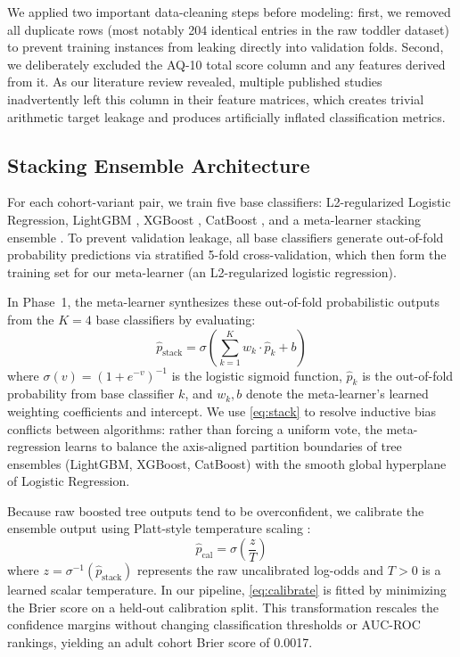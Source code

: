 \documentclass[conference]{IEEEtran}
\begin{document}
We applied two important data-cleaning steps before modeling: first, we removed all duplicate rows (most notably 204 identical entries in the raw toddler dataset) to prevent training instances from leaking directly into validation folds. Second, we deliberately excluded the AQ-10 total score column and any features derived from it. As our literature review revealed, multiple published studies inadvertently left this column in their feature matrices, which creates trivial arithmetic target leakage and produces artificially inflated classification metrics.

\subsection{Stacking Ensemble Architecture}

For each cohort-variant pair, we train five base classifiers: L2-regularized Logistic Regression, LightGBM \cite{ke2017lightgbm}, XGBoost \cite{chen2016xgboost}, CatBoost \cite{prokhorenkova2018catboost}, and a meta-learner stacking ensemble \cite{wolpert1992}. To prevent validation leakage, all base classifiers generate out-of-fold probability predictions via stratified 5-fold cross-validation, which then form the training set for our meta-learner (an L2-regularized logistic regression).

In Phase~1, the meta-learner synthesizes these out-of-fold probabilistic outputs from the $K = 4$ base classifiers by evaluating:
\begin{equation}
  \hat{p}_{\text{stack}} =
  \sigma\!\left(\sum_{k=1}^{K} w_k \cdot \hat{p}_k + b\right)
  \label{eq:stack}
\end{equation}
where $\sigma(v) = (1 + e^{-v})^{-1}$ is the logistic sigmoid function, $\hat{p}_k$ is the out-of-fold probability from base classifier $k$, and $w_k, b$ denote the meta-learner's learned weighting coefficients and intercept. We use \eqref{eq:stack} to resolve inductive bias conflicts between algorithms: rather than forcing a uniform vote, the meta-regression learns to balance the axis-aligned partition boundaries of tree ensembles (LightGBM, XGBoost, CatBoost) with the smooth global hyperplane of Logistic Regression.

Because raw boosted tree outputs tend to be overconfident, we calibrate the ensemble output using Platt-style temperature scaling \cite{venn2005}:
\begin{equation}
  \hat{p}_{\text{cal}} = \sigma\!\left(\frac{z}{T}\right)
  \label{eq:calibrate}
\end{equation}
where $z = \sigma^{-1}(\hat{p}_{\text{stack}})$ represents the raw uncalibrated log-odds and $T > 0$ is a learned scalar temperature. In our pipeline, \eqref{eq:calibrate} is fitted by minimizing the Brier score on a held-out calibration split. This transformation rescales the confidence margins without changing classification thresholds or AUC-ROC rankings, yielding an adult cohort Brier score of 0.0017.
\end{document}
